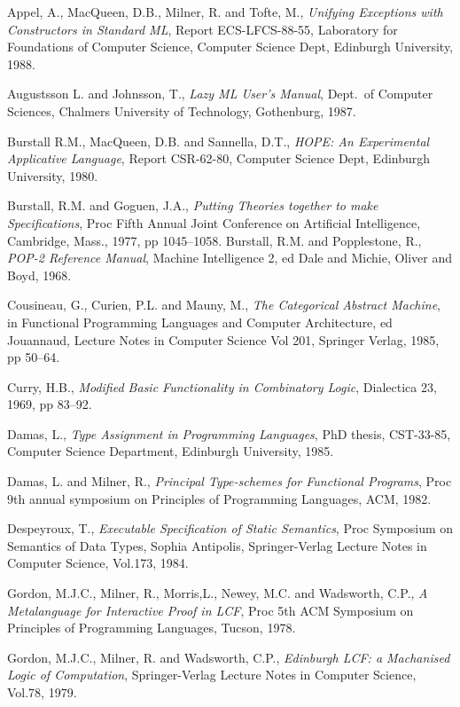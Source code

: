 \begin{thebibliography}{99}

 Appel, A., MacQueen, D.B., Milner, R. and Tofte, M., 
{\em Unifying Exceptions with Constructors in Standard ML}, Report ECS-LFCS-88-55,
Laboratory for Foundations of Computer Science, 
Computer Science Dept, Edinburgh University, 1988.

 Augustsson L. and Johnsson, T., {\em Lazy ML User's Manual}, 
Dept.\ of Computer Sciences, Chalmers University of Technology,
Gothenburg, 1987.

 Burstall R.M., MacQueen, D.B. and Sannella, D.T., 
{\em HOPE: An Experimental
Applicative Language}, Report CSR-62-80, 
Computer Science Dept, Edinburgh University, 1980.

 Burstall, R.M. and Goguen, J.A., {\em Putting Theories together to
make Specifications}, Proc Fifth Annual Joint Conference on Artificial
Intelligence, Cambridge, Mass., 1977, pp 1045--1058.
 Burstall, R.M. and Popplestone, R., {\em POP-2 Reference Manual},
Machine Intelligence 2, ed Dale and Michie, Oliver and Boyd, 1968.

 Cousineau, G., Curien, P.L. and Mauny, M., {\em The Categorical
Abstract Machine}, in Functional Programming Languages and Computer 
Architecture, ed Jouannaud, Lecture Notes in Computer Science Vol 201,
Springer Verlag, 1985, pp 50--64.

 Curry, H.B., {\em Modified Basic Functionality in Combinatory
Logic}, Dialectica 23, 1969, pp 83--92.

 Damas, L., {\em Type Assignment in Programming Languages}, PhD
thesis, CST-33-85, Computer Science Department, Edinburgh University, 1985.

 Damas, L. and Milner, R., {\em Principal Type-schemes for
Functional Programs}, Proc 9th annual symposium on Principles of Programming
Languages, ACM, 1982.

 Despeyroux, T., {\em Executable Specification of Static Semantics},
Proc Symposium on Semantics of Data Types, Sophia Antipolis,
Springer-Verlag Lecture Notes in Computer Science, Vol.173, 1984.

 Gordon, M.J.C., Milner, R., Morris,L., Newey, M.C. and 
Wadsworth, C.P., {\em A Metalanguage for Interactive Proof in LCF}, 
Proc 5th ACM Symposium on Principles of
Programming Languages, Tucson, 1978.
 
 Gordon, M.J.C., Milner, R. and Wadsworth, C.P., 
{\em Edinburgh LCF: a Machanised Logic of Computation},
Springer-Verlag Lecture Notes in Computer Science, Vol.78, 1979.


\end{thebibliography}
